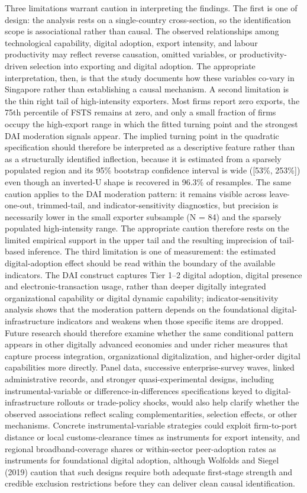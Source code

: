 \documentclass[12pt,a4paper]{article}
\begin{document}
Three limitations warrant caution in interpreting the findings. The
first is one of design: the analysis rests on a single-country
cross-section, so the identification scope is associational rather than
causal. The observed relationships among technological capability,
digital adoption, export intensity, and labour productivity may reflect
reverse causation, omitted variables, or productivity-driven selection
into exporting and digital adoption. The appropriate interpretation,
then, is that the study documents how these variables co-vary in
Singapore rather than establishing a causal mechanism. A second
limitation is the thin right tail of high-intensity exporters. Most
firms report zero exports, the 75th percentile of FSTS remains at zero,
and only a small fraction of firms occupy the high-export range in which
the fitted turning point and the strongest DAI moderation signals
appear. The implied turning point in the quadratic specification should
therefore be interpreted as a descriptive feature rather than as a
structurally identified inflection, because it is estimated from a
sparsely populated region and its 95\% bootstrap confidence interval is
wide ({[}53\%, 253\%{]}) even though an inverted-U shape is recovered in
96.3\% of resamples. The same caution applies to the DAI moderation
pattern: it remains visible across leave-one-out, trimmed-tail, and
indicator-sensitivity diagnostics, but precision is necessarily lower in
the small exporter subsample (N = 84) and the sparsely populated
high-intensity range. The appropriate caution therefore rests on the
limited empirical support in the upper tail and the resulting
imprecision of tail-based inference. The third limitation is one of
measurement: the estimated digital-adoption effect should be read within
the boundary of the available indicators. The DAI construct captures
Tier 1--2 digital adoption, digital presence and electronic-transaction
usage, rather than deeper digitally integrated organizational capability
or digital dynamic capability; indicator-sensitivity analysis shows that
the moderation pattern depends on the foundational
digital-infrastructure indicators and weakens when those specific items
are dropped. Future research should therefore examine whether the same
conditional pattern appears in other digitally advanced economies and
under richer measures that capture process integration, organizational
digitalization, and higher-order digital capabilities more directly.
Panel data, successive enterprise-survey waves, linked administrative
records, and stronger quasi-experimental designs, including
instrumental-variable or difference-in-differences specifications keyed
to digital-infrastructure rollouts or trade-policy shocks, would also
help clarify whether the observed associations reflect scaling
complementarities, selection effects, or other mechanisms. Concrete
instrumental-variable strategies could exploit firm-to-port distance or
local customs-clearance times as instruments for export intensity, and
regional broadband-coverage shares or within-sector peer-adoption rates
as instruments for foundational digital adoption, although Wolfolds and
Siegel (2019) caution that such designs require both adequate
first-stage strength and credible exclusion restrictions before they can
deliver clean causal identification.
\end{document}
